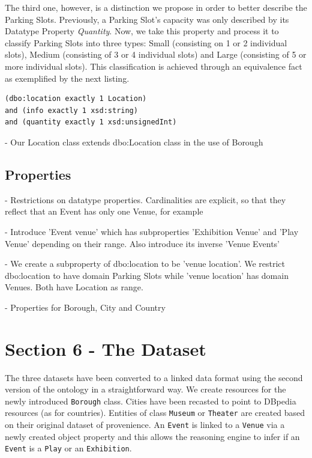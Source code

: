 \documentclass[runningheads,a4paper]{../../StyleFiles/llncs}
\begin{document}
The third one, however, is a distinction we propose in order to better describe the Parking Slots. Previously, a Parking Slot's capacity was only described by its Datatype Property \textit{Quantity}. Now, we take this property and process it to classify Parking Slots into three types: Small (consisting on 1 or 2 individual slots), Medium (consisting of 3 or 4 individual slots) and Large (consisting of 5 or more individual slots). This classification is achieved through an equivalence fact as exemplified by the next listing. \\

\begin{lstlisting}[captionpos=b, caption=Definition of Large Slot a subclass of Parking Slot, label=lst:owl, basicstyle=\ttfamily\small,frame=bt]
(dbo:location exactly 1 Location)
and (info exactly 1 xsd:string)
and (quantity exactly 1 xsd:unsignedInt)
\end{lstlisting}

- Our Location class extends dbo:Location class in the use of Borough

\subsection{Properties}

- Restrictions on datatype properties. Cardinalities are explicit, so that they reflect that an Event has only one Venue, for example

- Introduce 'Event venue' which has subproperties 'Exhibition Venue' and 'Play Venue' depending on their range. Also introduce its inverse 'Venue Events'

- We create a subproperty of dbo:location to be 'venue location'. We restrict dbo:location to have domain Parking Slots while 'venue location' has domain Venues. Both have Location as range.

- Properties for Borough, City and Country


\section{Section 6 - The Dataset}
The three datasets have been converted to a linked data format using the second
version of the ontology in a straightforward way. We create
resources for the newly introduced \texttt{Borough} class. Cities have been
recasted to point to DBpedia resources (as for countries).
Entities of class \texttt{Museum} or \texttt{Theater} are created based on their
original dataset of provenience. An \texttt{Event} is linked to a
\texttt{Venue} via a newly created object property and this allows the reasoning
engine to infer if an \texttt{Event} is a \texttt{Play} or an \texttt{Exhibition}.
\end{document}
